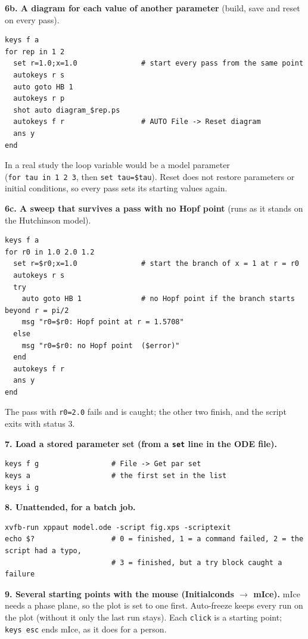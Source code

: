 \documentclass{article}
\begin{document}
\textbf{6b. A diagram for each value of another parameter}
(build, save and reset on every pass).

{\small\begin{verbatim}
keys f a
for rep in 1 2
  set r=1.0;x=1.0               # start every pass from the same point
  autokeys r s
  auto goto HB 1
  autokeys r p
  shot auto diagram_$rep.ps
  autokeys f r                  # AUTO File -> Reset diagram
  ans y
end
\end{verbatim}}

In a real study the loop variable would be a model parameter
(\texttt{for\ tau\ in\ 1\ 2\ 3}, then \texttt{set\ tau=\$tau}). Reset
does not restore parameters or initial conditions, so every pass sets
its starting values again.

\textbf{6c. A sweep that survives a pass with no Hopf point}
(runs as it stands on the Hutchinson model).

{\small\begin{verbatim}
keys f a
for r0 in 1.0 2.0 1.2
  set r=$r0;x=1.0               # start the branch of x = 1 at r = r0
  autokeys r s
  try
    auto goto HB 1              # no Hopf point if the branch starts beyond r = pi/2
    msg "r0=$r0: Hopf point at r = 1.5708"
  else
    msg "r0=$r0: no Hopf point  ($error)"
  end
  autokeys f r
  ans y
end
\end{verbatim}}

The pass with \texttt{r0=2.0} fails and is caught; the other two
finish, and the script exits with status 3.

\textbf{7. Load a stored parameter set (from a \texttt{set} line
in the ODE file).}

{\small\begin{verbatim}
keys f g                 # File -> Get par set
keys a                   # the first set in the list
keys i g
\end{verbatim}}

\textbf{8. Unattended, for a batch job.}

{\small\begin{verbatim}
xvfb-run xppaut model.ode -script fig.xps -scriptexit
echo $?                  # 0 = finished, 1 = a command failed, 2 = the script had a typo,
                         # 3 = finished, but a try block caught a failure
\end{verbatim}}

\textbf{9. Several starting points with the mouse (Initialconds $\rightarrow$
mIce).} mIce needs a phase plane, so the plot is set to one
first. Auto-freeze keeps every run on the plot (without it only the last
run stays). Each \texttt{click} is a starting point; \texttt{keys\ esc}
ends mIce, as it does for a person.
\end{document}
